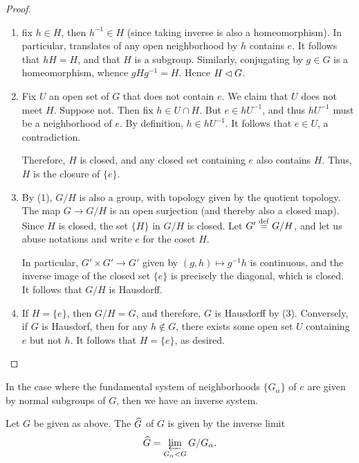 \begin{proof}
\begin{enumerate}
\item fix $h \in H$, then $h^{-1} \in H$ (since taking inverse is 
also a homeomorphism). In particular, translates of any open 
neighborhood by $h$ contains $e$. It follows that $hH = H$, and 
that $H$ is a subgroup. Similarly, conjugating by $g \in G$ is a 
homeomorphism, whence $gHg^{-1} = H$. Hence $H \lhd G$.

\item Fix $U$ an open set of $G$ that does not contain $e$. We
claim that $U$ does not meet $H$. Suppose not. Then fix $h \in U 
\cap H$. But $e \in hU^{-1}$, and thus $hU^{-1}$ must be a 
neighborhood of $e$. By definition, $h \in hU^{-1}$. It follows
that $e \in U$, a contradiction.

Therefore, $H$ is closed, and any closed set containing $e$
also contains $H$. Thus, $H$ is the closure of $\{e\}$.

\item By (1), $G/H$ is also a group, with topology given by the
quotient topology. The map $G \to G/H$ is an open surjection (and 
thereby also a closed map). Since $H$ is closed, the set $\{H\}$ 
in $G/H$ is closed. Let $G' \stackrel{\mathrm{def}}{=} G/H$, and let us abuse 
notations and write $e$ for the coset $H$.

In particular, $G' \times G' \to G'$ given by $(g, h) \mapsto 
g^{-1}h$ is continuous, and the inverse image of the closed set 
$\{e\}$ is precisely the diagonal, which is closed. It follows 
that $G/H$ is Hausdorff.

\item If $H = \{e\}$, then $G/H = G$, and therefore, $G$ is Hausdorff
by (3). Conversely, if $G$ is Hausdorf, then for any $h \notin G$,
there exists some open set $U$ containing $e$ but not $h$. It
follows that $H = \{e\}$, as desired.
\end{enumerate}
\end{proof}

In the case where the fundamental system of neighborhoods 
$\{G_\alpha\}$ of $e$ are given by normal subgroups of $G$, then 
we have an inverse system.

\begin{defn}
Let $G$ be given as above. The 
$\widehat{G}$ of $G$ is given by the inverse limit
\[
\widehat{G} = \varprojlim_{G_\alpha < G} G/G_\alpha.
\]
\end{defn}

